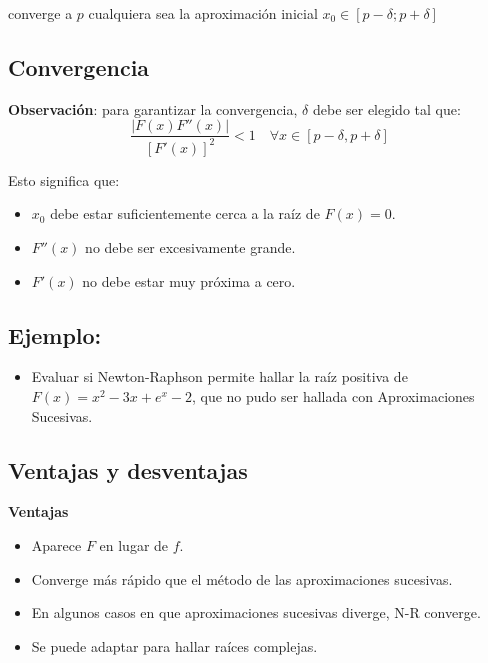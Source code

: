 \documentclass[openany]{book}
\providecommand{\tightlist}{%
  \setlength{\itemsep}{0pt}\setlength{\parskip}{0pt}}
\begin{document}
converge a \(p\) cualquiera sea la aproximación inicial \(x_0 \in [p - \delta; p + \delta]\)

\hypertarget{convergencia}{%
\subsection{Convergencia}\label{convergencia}}

\textbf{Observación}: para garantizar la convergencia, \(\delta\) debe ser elegido tal que:
\[\frac{|F(x)F''(x)|}{[F'(x)]^2} < 1  \quad \forall x \in [p - \delta, p + \delta]\]

Esto significa que:

\begin{itemize}
\tightlist
\item
  \(x_0\) debe estar suficientemente cerca a la raíz de \(F(x) = 0\).
\item
  \(F''(x)\) no debe ser excesivamente grande.
\item
  \(F'(x)\) no debe estar muy próxima a cero.
\end{itemize}

\hypertarget{ejemplo-6}{%
\subsection{Ejemplo:}\label{ejemplo-6}}

\begin{itemize}
\tightlist
\item
  Evaluar si Newton-Raphson permite hallar la raíz positiva de \(F(x) = x^2-3x+e^x-2\), que no pudo ser hallada con Aproximaciones Sucesivas.
\end{itemize}

\hypertarget{ventajas-y-desventajas}{%
\subsection{Ventajas y desventajas}\label{ventajas-y-desventajas}}

\textbf{Ventajas}

\begin{itemize}
\tightlist
\item
  Aparece \(F\) en lugar de \(f\).
\item
  Converge más rápido que el método de las aproximaciones sucesivas.
\item
  En algunos casos en que aproximaciones sucesivas diverge, N-R converge.
\item
  Se puede adaptar para hallar raíces complejas.
\end{itemize}
\end{document}
